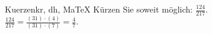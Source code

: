 \begin{MAufgabe}{Kuerzen}{kr, dh, MaTeX}
K\"urzen Sie soweit m\"oglich: $\frac{124}{217}$.\\ 
\ifLsg\MLoesung
\quad $\frac{124}{217}=\frac{(31)\cdot(4)}{(31)\cdot(7)}=\frac{4}{7}$.\else\relax\fi
 \end{MAufgabe}